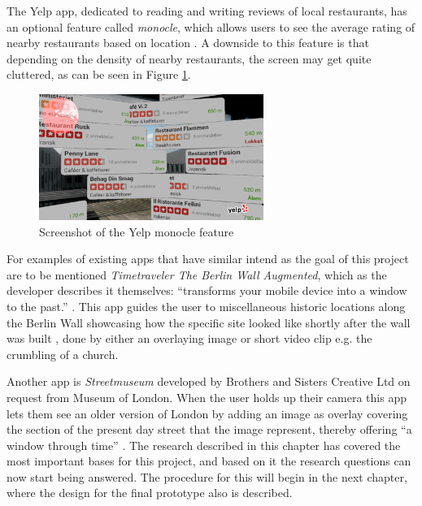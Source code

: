 The Yelp app, dedicated to reading and writing reviews of local restaurants, has an optional feature called \textit{monocle}, which allows users to see the average rating of nearby restaurants based on location \cite{Yelp}. A downside to this feature is that depending on the density of nearby restaurants, the screen may get quite cluttered, as can be seen in Figure \ref{fig:yelp}.

\begin{figure}[h!]
    \centering
    \includegraphics[width=0.65\textwidth]{figures/yelp.png}
    \caption{Screenshot of the Yelp monocle feature}\label{fig:yelp}
\end{figure}


For examples of existing apps that have similar intend as the goal of this project are to be mentioned \textit{Timetraveler The Berlin Wall Augmented}, which as the developer describes it themselves: “transforms your mobile device into a window to the past.” . This app guides the user to miscellaneous historic locations along the Berlin Wall showcasing how the specific site looked like shortly after the wall was built , done by either an overlaying image or short video clip e.g. the crumbling of a church. 

Another app is \textit{Streetmuseum} developed by Brothers and Sisters Creative Ltd on request from Museum of London. When the user holds up their camera this app lets them see an older version of London by adding an image as overlay covering the section of the present day street that the image represent, thereby offering “a window through time”  .
The research described in this chapter has covered the most important bases for this project, and based on it the research questions can now start being answered. The procedure for this will begin in the next chapter, where the design for the final prototype also is described. 


